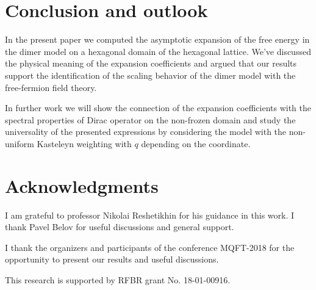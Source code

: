 \documentclass{article}
\begin{document}
\section*{Conclusion and outlook}
\label{sec:conclusion}

In the present paper we computed the asymptotic expansion of the free energy in the dimer model on a
hexagonal domain of the hexagonal lattice. We've discussed the physical meaning of the expansion
coefficients and argued that our results support the identification of the scaling behavior of the
dimer model with the free-fermion field theory.

In further work we will show the connection of the expansion coefficients with the spectral
properties of Dirac operator on the non-frozen domain and study the universality of the presented
expressions by considering the model with the non-uniform Kasteleyn weighting with $q$ depending on
the coordinate. 

\section*{Acknowledgments}
\label{sec:acknowledgements}
I am grateful to professor Nikolai Reshetikhin for his guidance in this work. I thank Pavel Belov
for useful discussions and general support.

I thank the organizers and participants of the conference MQFT-2018 for the opportunity
to present our results and useful discussions.

This research is supported by RFBR grant No. 18-01-00916.


{} 
\end{document}
